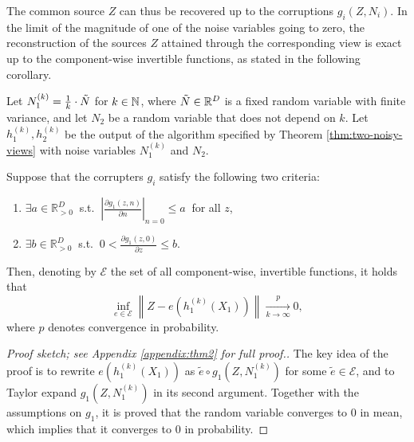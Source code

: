 The common source $Z$ can thus be recovered up to the corruptions ${g}_i(Z, N_i)$.
In the limit of the magnitude of one of the noise variables going to zero, the reconstruction of the sources $Z$ attained through the corresponding view is exact up to the component-wise invertible functions, as stated in the following corollary.

\medskip
\begin{corollary}
	\label{crl:lownoise}
	Let $N_1^{(k)} = \frac{1}{k} \cdot  \Tilde{N}$ for $k \in \mathbb{N}$, where $\Tilde{N}\in\mathbb{R}^D$ is a fixed random variable with finite variance, and let $N_2$ be a random variable that does not depend on $k$.
	Let $h_1^{(k)}, h_2^{(k)}$ be the output of the algorithm specified by Theorem \ref{thm:two-noisy-views} with noise variables $N_1^{(k)}$ and $N_2$.
	
	Suppose that the corrupters $g_i$ satisfy the following two criteria:
	\begin{enumerate}
		\item $\exists {a}  \in \mathbb{R}_{> 0}^D \: $   s.t. $\: \left|\frac{\partial g_1(z,n)}{\partial n} \right|_{n=0} \leq {a} \: $ for all ${z}$,
		\item $\exists {b}  \in \mathbb{R}_{> 0}^D \: $ s.t. $\: 0<\frac{\partial g_1(z,0)}{\partial z} \leq b$.
	\end{enumerate}
	Then, denoting by $\mathcal{E}$ the set of all component-wise, invertible functions, it holds that
	\[
	 \inf_{{e}\in \mathcal{E}}  \left \|Z - {e}(h_1^{(k)}(X_1)) \right \| \xrightarrow[k \to \infty]{p} 0,
	\]
	where $p$ denotes convergence in probability.
\end{corollary}

\begin{proof}[Proof sketch; see Appendix \ref{appendix:thm2} for full proof.]
The key idea of the proof is to rewrite ${e}(h_1^{(k)}(X_1))$ as $\tilde{e} \circ g_1(Z, N_1^{(k)})$ for some $\tilde{e} \in \mathcal{E}$, and to Taylor expand $g_1(Z, N_1^{(k)})$ in its second argument.
Together with the assumptions on $g_1$, it is proved that the random variable converges to $0$ in mean, which implies that it converges to $0$ in probability.
\end{proof}

